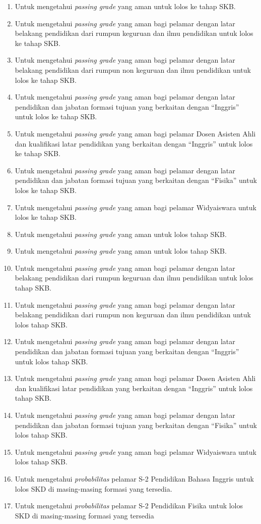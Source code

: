 \documentclass[
]{article}
\providecommand{\tightlist}{%
  \setlength{\itemsep}{0pt}\setlength{\parskip}{0pt}}
\begin{document}
\begin{enumerate}
\def\labelenumi{\arabic{enumi}.}
\tightlist
\item
  Untuk mengetahui \emph{passing grade} yang aman untuk lolos ke tahap
  SKB.
\item
  Untuk mengetahui \emph{passing grade} yang aman bagi pelamar dengan
  latar belakang pendidikan dari rumpun keguruan dan ilmu pendidikan
  untuk lolos ke tahap SKB.
\item
  Untuk mengetahui \emph{passing grade} yang aman bagi pelamar dengan
  latar belakang pendidikan dari rumpun non keguruan dan ilmu pendidikan
  untuk lolos ke tahap SKB.
\item
  Untuk mengetahui \emph{passing grade} yang aman bagi pelamar dengan
  latar pendidikan dan jabatan formasi tujuan yang berkaitan dengan
  ``Inggris'' untuk lolos ke tahap SKB.
\item
  Untuk mengetahui \emph{passing grade} yang aman bagi pelamar Dosen
  Asisten Ahli dan kualifikasi latar pendidikan yang berkaitan dengan
  ``Inggris'' untuk lolos ke tahap SKB.
\item
  Untuk mengetahui \emph{passing grade} yang aman bagi pelamar dengan
  latar pendidikan dan jabatan formasi tujuan yang berkaitan dengan
  ``Fisika'' untuk lolos ke tahap SKB.
\item
  Untuk mengetahui \emph{passing grade} yang aman bagi pelamar
  Widyaiswara untuk lolos ke tahap SKB.
\item
  Untuk mengetahui \emph{passing grade} yang aman untuk lolos tahap SKB.
\item
  Untuk mengetahui \emph{passing grade} yang aman untuk lolos tahap SKB.
\item
  Untuk mengetahui \emph{passing grade} yang aman bagi pelamar dengan
  latar belakang pendidikan dari rumpun keguruan dan ilmu pendidikan
  untuk lolos tahap SKB.
\item
  Untuk mengetahui \emph{passing grade} yang aman bagi pelamar dengan
  latar belakang pendidikan dari rumpun non keguruan dan ilmu pendidikan
  untuk lolos tahap SKB.
\item
  Untuk mengetahui \emph{passing grade} yang aman bagi pelamar dengan
  latar pendidikan dan jabatan formasi tujuan yang berkaitan dengan
  ``Inggris'' untuk lolos tahap SKB.
\item
  Untuk mengetahui \emph{passing grade} yang aman bagi pelamar Dosen
  Asisten Ahli dan kualifikasi latar pendidikan yang berkaitan dengan
  ``Inggris'' untuk lolos tahap SKB.
\item
  Untuk mengetahui \emph{passing grade} yang aman bagi pelamar dengan
  latar pendidikan dan jabatan formasi tujuan yang berkaitan dengan
  ``Fisika'' untuk lolos tahap SKB.
\item
  Untuk mengetahui \emph{passing grade} yang aman bagi pelamar
  Widyaiswara untuk lolos tahap SKB.
\item
  Untuk mengetahui \emph{probabilitas} pelamar S-2 Pendidikan Bahasa
  Inggris untuk lolos SKD di masing-masing formasi yang tersedia.
\item
  Untuk mengetahui \emph{probabilitas} pelamar S-2 Pendidikan Fisika
  untuk lolos SKD di masing-masing formasi yang tersedia
\end{enumerate}
\end{document}
